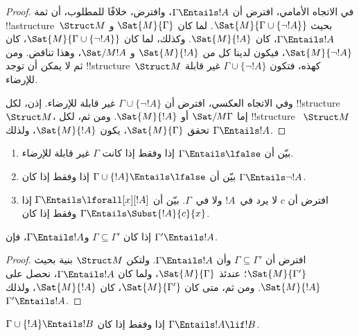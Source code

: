 \documentclass[../../../include/open-logic-section]{subfiles}
\begin{document}
\begin{proof}
في الاتجاه الأمامي، افترض أن $\Gamma \Entails !A$، وافترض، خلافًا
للمطلوب، أن ثمة !!a{structure}~$\Struct M$ بحيث
$\Sat{M}{\Gamma \cup \{ \lnot !A \}}$. لما كان
$\Sat{M}{\Gamma}$ و$\Gamma \Entails !A$، كان $\Sat{M}{!A}$.
وكذلك، لما كان $\Sat{M}{\Gamma\cup \{ \lnot !A \}}$، كان
$\Sat{M}{\lnot !A}$، فيكون لدينا كل من $\Sat{M}{!A}$ و
$\Sat/{M}{!A}$، وهذا تناقض. ومن ثم لا يمكن أن توجد
!!{structure}~$\Struct M$ كهذه، فتكون
$\Gamma \cup \{ \lnot !A \}$ غير قابلة للإرضاء.

وفي الاتجاه العكسي، افترض أن $\Gamma \cup \{ \lnot !A \}$ غير
قابلة للإرضاء. إذن، لكل !!{structure}~$\Struct M$، إما
$\Sat/{M}{\Gamma}$ أو $\Sat{M}{!A}$. ومن ثم، لكل !!{structure}
~$\Struct M$ تحقق $\Sat{M}{\Gamma}$، يكون $\Sat{M}{!A}$،
ولذلك $\Gamma \Entails !A$.
\end{proof}

\begin{prob}
\begin{enumerate}
\item بيّن أن $\Gamma \Entails \lfalse$ إذا وفقط إذا كانت $\Gamma$
  غير قابلة للإرضاء.
\item بيّن أن $\Gamma \cup \{!A\} \Entails \lfalse$ إذا وفقط إذا
  كان $\Gamma \Entails \lnot !A$.
\item افترض أن $c$ لا يرد في~$!A$ ولا في~$\Gamma$. بيّن أن
  $\Gamma \Entails \lforall[x][!A]$ إذا وفقط إذا كان
  $\Gamma \Entails \Subst{!A}{c}{x}$.
\end{enumerate}
\end{prob}

\begin{prop}
إذا كان $\Gamma \subseteq \Gamma'$ و$\Gamma \Entails !A$، فإن
$\Gamma' \Entails !A$.
\end{prop}

\begin{proof}
افترض أن $\Gamma \subseteq \Gamma'$ وأن $\Gamma \Entails !A$.
ولتكن $\Struct M$ بنية بحيث $\Sat{M}{\Gamma'}$؛ عندئذ
$\Sat{M}{\Gamma}$، ولما كان $\Gamma \Entails !A$، نحصل على
$\Sat{M}{!A}$. ومن ثم، متى كان $\Sat{M}{\Gamma'}$، كان
$\Sat{M}{!A}$، ولذلك $\Gamma' \Entails !A$.
\end{proof}


\begin{thm}
$\Gamma \cup \{!A\} \Entails !B$ إذا وفقط إذا كان
$\Gamma \Entails !A \lif !B$.
\end{thm}
\end{document}
